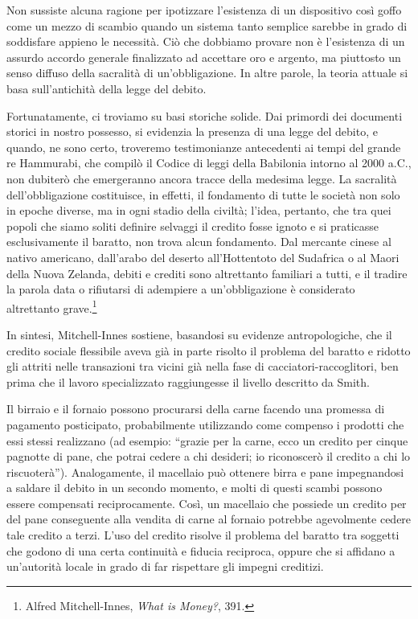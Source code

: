 \documentclass[
  a5paper,
  smalldemyvopaper,10pt,twoside,onecolumn,openright,extrafontsizes,hidelinks]{memoir}
\renewenvironment{quote}%
               {\list{}{\rightmargin=.6cm\leftmargin=.6cm}%
                \itshape \item[]}%
               {\endlist}
\begin{document}
\begin{quote}
Non sussiste alcuna ragione per ipotizzare l'esistenza di un dispositivo
così goffo come un mezzo di scambio quando un sistema tanto semplice
sarebbe in grado di soddisfare appieno le necessità. Ciò che dobbiamo
provare non è l'esistenza di un assurdo accordo generale finalizzato ad
accettare oro e argento, ma piuttosto un senso diffuso della sacralità
di un'obbligazione. In altre parole, la teoria attuale si basa
sull'antichità della legge del debito.
\end{quote}

\begin{quote}
Fortunatamente, ci troviamo su basi storiche solide. Dai primordi dei
documenti storici in nostro possesso, si evidenzia la presenza di una
legge del debito, e quando, ne sono certo, troveremo testimonianze
antecedenti ai tempi del grande re Hammurabi, che compilò il Codice di
leggi della Babilonia intorno al 2000 a.C., non dubiterò che emergeranno
ancora tracce della medesima legge. La sacralità dell'obbligazione
costituisce, in effetti, il fondamento di tutte le società non solo in
epoche diverse, ma in ogni stadio della civiltà; l'idea, pertanto, che
tra quei popoli che siamo soliti definire selvaggi il credito fosse
ignoto e si praticasse esclusivamente il baratto, non trova alcun
fondamento. Dal mercante cinese al nativo americano, dall'arabo del
deserto all'Hottentoto del Sudafrica o al Maori della Nuova Zelanda,
debiti e crediti sono altrettanto familiari a tutti, e il tradire la
parola data o rifiutarsi di adempiere a un'obbligazione è considerato
altrettanto grave.\footnote{Alfred Mitchell-Innes, \emph{What is
  Money?}, 391.}
\end{quote}

In sintesi, Mitchell-Innes sostiene, basandosi su evidenze
antropologiche, che il credito sociale flessibile aveva già in parte
risolto il problema del baratto e ridotto gli attriti nelle transazioni
tra vicini già nella fase di cacciatori-raccoglitori, ben prima che il
lavoro specializzato raggiungesse il livello descritto da Smith.

Il birraio e il fornaio possono procurarsi della carne facendo una
promessa di pagamento posticipato, probabilmente utilizzando come
compenso i prodotti che essi stessi realizzano (ad esempio: ``grazie per
la carne, ecco un credito per cinque pagnotte di pane, che potrai cedere
a chi desideri; io riconoscerò il credito a chi lo riscuoterà'').
Analogamente, il macellaio può ottenere birra e pane impegnandosi a
saldare il debito in un secondo momento, e molti di questi scambi
possono essere compensati reciprocamente. Così, un macellaio che
possiede un credito per del pane conseguente alla vendita di carne al
fornaio potrebbe agevolmente cedere tale credito a terzi. L'uso del
credito risolve il problema del baratto tra soggetti che godono di una
certa continuità e fiducia reciproca, oppure che si affidano a
un'autorità locale in grado di far rispettare gli impegni creditizi.
\end{document}
